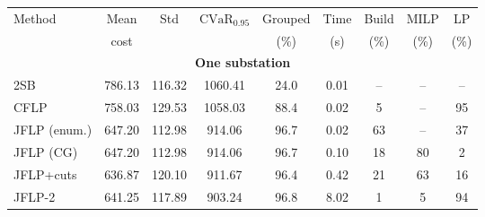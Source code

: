 \documentclass{article}
\begin{document}
\begin{table}[H]
\centering
\small
\setlength{\tabcolsep}{4pt}
\begin{tabular}{lcccccccc}
\toprule
Method & Mean & Std & $\mathrm{CVaR}_{0.95}$ & Grouped & Time & Build & MILP & LP \\
 & cost & & & (\%) & (s) & (\%) & (\%) & (\%) \\
\midrule
\multicolumn{9}{c}{\textbf{One substation}} \\
\midrule
2SB & 786.13 & 116.32 & 1060.41 & 24.0 & 0.01 & -- & -- & -- \\
CFLP & 758.03 & 129.53 & 1058.03 & 88.4 & 0.02 & 5 & -- & 95 \\
JFLP (enum.) & 647.20 & 112.98 & 914.06 & 96.7 & 0.02 & 63 & -- & 37 \\
JFLP (CG) & 647.20 & 112.98 & 914.06 & 96.7 & 0.10 & 18 & 80 & 2 \\
JFLP+cuts & 636.87 & 120.10 & 911.67 & 96.4 & 0.42 & 21 & 63 & 16 \\
JFLP-2 & 641.25 & 117.89 & 903.24 & 96.8 & 8.02 & 1 & 5 & 94 \\

\end{tabular}
\end{table}
\end{document}
